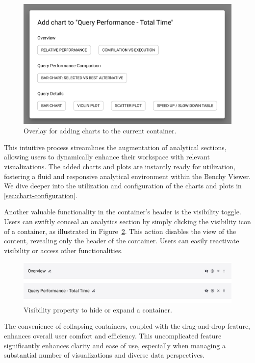 \begin{figure}[h]
  \centering
  \includegraphics[width=0.6\linewidth]{figures/analytics-add-chart.png}
  \caption{Overlay for adding charts to the current container.}
  \label{fig:analytics-add-chart}
\end{figure}

This intuitive process streamlines the augmentation of analytical sections, allowing users to dynamically enhance their workspace with relevant visualizations. The added charts and plots are instantly ready for utilization, fostering a fluid and responsive analytical environment within the Benchy Viewer.\\
We dive deeper into the utilization and configuration of the charts and plots in \ref{sec:chart-configuration}.


Another valuable functionality in the container's header is the visibility toggle. Users can swiftly conceal an analytics section by simply clicking the visibility icon of a container, as illustrated in Figure~\ref{fig:analytics-section-visibility}. This action disables the view of the content, revealing only the header of the container. Users can easily reactivate visibility or access other functionalities.

\begin{figure}[h]
  \centering
  \includegraphics[width=0.8\linewidth]{figures/analytics-section-visibility.png}
  \caption{Visibility property to hide or expand a container.}
  \label{fig:analytics-section-visibility}
\end{figure}

The convenience of collapsing containers, coupled with the drag-and-drop feature, enhances overall user comfort and efficiency. This uncomplicated feature significantly enhances clarity and ease of use, especially when managing a substantial number of visualizations and diverse data perspectives.

